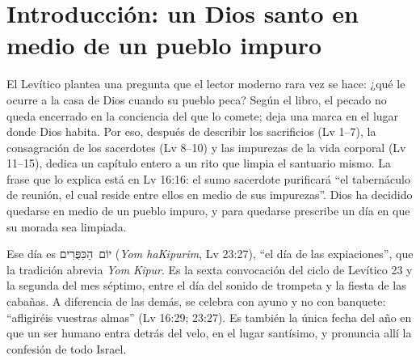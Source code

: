 \documentclass[11pt,letterpaper]{article}
\newcommand{\heb}[1]{\mbox{\foreignlanguage{hebrew}{#1}}}
\begin{document}
\section{Introducción: un Dios santo en medio de un pueblo impuro}

El Levítico plantea una pregunta que el lector moderno rara vez se hace: ¿qué le ocurre a la casa de Dios cuando su pueblo peca? Según el libro, el pecado no queda encerrado en la conciencia del que lo comete; deja una marca en el lugar donde Dios habita. Por eso, después de describir los sacrificios (Lv 1--7), la consagración de los sacerdotes (Lv 8--10) y las impurezas de la vida corporal (Lv 11--15), dedica un capítulo entero a un rito que limpia el santuario mismo. La frase que lo explica está en Lv 16:16: el sumo sacerdote purificará ``el tabernáculo de reunión, el cual reside entre ellos en medio de sus impurezas''. Dios ha decidido quedarse en medio de un pueblo impuro, y para quedarse prescribe un día en que su morada sea limpiada.

Ese día es \heb{יוֹם הַכִּפֻּרִים} (\emph{Yom haKipurim}, Lv 23:27), ``el día de las expiaciones'', que la tradición abrevia \emph{Yom Kipur}. Es la sexta convocación del ciclo de Levítico 23 y la segunda del mes séptimo, entre el día del sonido de trompeta y la fiesta de las cabañas. A diferencia de las demás, se celebra con ayuno y no con banquete: ``afligiréis vuestras almas'' (Lv 16:29; 23:27). Es también la única fecha del año en que un ser humano entra detrás del velo, en el lugar santísimo, y pronuncia allí la confesión de todo Israel.
\end{document}
